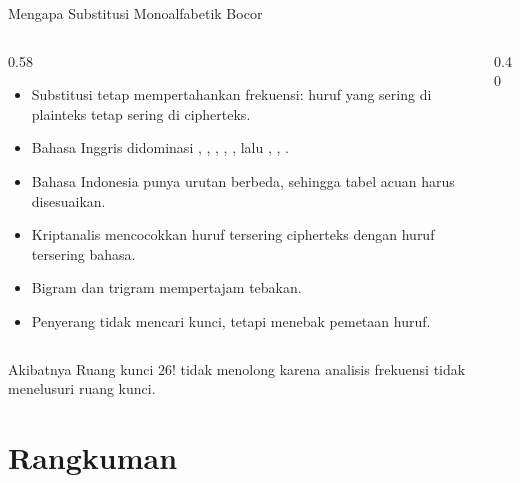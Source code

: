 \documentclass[aspectratio=169,11pt]{beamer}
\begin{document}
\begin{frame}{Mengapa Substitusi Monoalfabetik Bocor}
    \footnotesize
    \begin{columns}[T,onlytextwidth]
        \begin{column}{0.58\textwidth}
            \begin{itemize}
                \item Substitusi tetap mempertahankan frekuensi: huruf yang
                      sering di plainteks tetap sering di cipherteks.
                \item Bahasa Inggris didominasi , , ,
                      , , lalu , , .
                \item Bahasa Indonesia punya urutan berbeda, sehingga tabel
                      acuan harus disesuaikan.
                \item Kriptanalis mencocokkan huruf tersering cipherteks dengan
                      huruf tersering bahasa.
                \item Bigram dan trigram mempertajam tebakan.
                \item Penyerang tidak mencari kunci, tetapi menebak pemetaan
                      huruf.
            \end{itemize}
        \end{column}
        \begin{column}{0.40\textwidth}
            \centering
        \end{column}
    \end{columns}
    \vspace{0.05cm}
    \begin{alertblock}{Akibatnya}
        \footnotesize
        Ruang kunci $26!$ tidak menolong karena analisis frekuensi tidak
        menelusuri ruang kunci.
    \end{alertblock}
\end{frame}

\section{Rangkuman}
\end{document}
